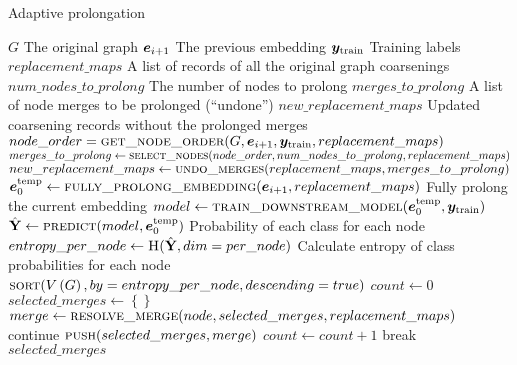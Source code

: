 \begin{algorithm}
  \caption{Adaptive prolongation}
  \label{alg:adaptive-prolongation}
  \begin{algorithmic}
    \Require $ G $ \Comment The original graph
    \Require $ \bm{e}_{i+1} $ \Comment The previous embedding
    \Require $ \bm{y}_\mathrm{train} $ \Comment Training labels
    \Require $ replacement\_maps $ \Comment A list of records of all the original graph coarsenings
    \Require $ num\_nodes\_to\_prolong $ \Comment The number of nodes to prolong
    \Ensure $ merges\_to\_prolong $ \Comment A list of node merges to be prolonged (\enquote{undone})
    \Ensure $ new\_replacement\_maps $ \Comment Updated coarsening records without the prolonged merges
    \Statex
      \State $ node\_order = \Call{get\_node\_order}{G, \bm{e}_{i+1}, \bm{y}_\mathrm{train}, replacement\_maps} $
    \State $ merges\_to\_prolong \gets \Call{select\_nodes}{node\_order, num\_nodes\_to\_prolong, replacement\_maps} $
    \State $ new\_replacement\_maps \gets \Call{undo\_merges}{replacement\_maps, merges\_to\_prolong} $
    \Statex
        \State $ \bm{e}_0^\mathrm{temp} \gets \Call{fully\_prolong\_embedding}{\bm{e}_{i+1}, replacement\_maps} $ \Comment Fully prolong the current embedding
        \State $ model \gets \Call{train\_downstream\_model}{\bm{e}_0^\mathrm{temp}, \bm{y}_\mathrm{train}} $
        \State $ \hat{\mathmat{Y}} \gets \Call{predict}{model, \bm{e}_0^\mathrm{temp}} $ \Comment Probability of each class for each node
        \State $ entropy\_per\_node \gets \Call{H}{\hat{\mathmat{Y}}, dim = per\_node} $ \Comment Calculate entropy of class probabilities for each node
        \State \Return $ \Call{sort}{V \left( G \right), by = entropy\_per\_node, descending = true} $
    \EndFunction
    \Statex
        \State $ count \gets 0 $
        \State $ selected\_merges \gets \left\{ \right\} $
            \State $ merge \gets \Call{resolve\_merge}{node, selected\_merges, replacement\_maps} $
                \State continue
            \EndIf
            \State $ \Call{push}{selected\_merges, merge} $
            \State $ count \gets count + 1 $
                \State break
            \EndIf
        \EndFor
        \State \Return $ selected\_merges $
    \EndFunction

\end{algorithmic}
\end{algorithm}

